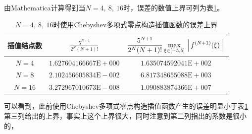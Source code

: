 \documentclass[11pt]{article}
\begin{document}
由Mathematica计算得到当$N = 4,\ 8,\ 16$时，误差的数值上界可列为表\ref{table2}。
\begin{table}[h]
    \centering
    \begin{tabular}{|c|c|c|}
        \hline
        插值结点数 & $\displaystyle \frac{5^{N + 1}}{2^N(N + 1)!}$ & $\displaystyle \frac{5^{N + 1}}{2^N(N + 1)!} \max_{\xi \in [-5, 5]}{\left \arrowvert f^{(N + 1)}(\xi) \right \arrowvert} $ \\ \hline
        $N = 4$    & $1.627604166667\text{E}+000$                  & $1.635074592041\text{E}+002$                                                                                               \\ \hline
        $N = 8$    & $2.102456605834\text{E}-002$                  & $6.817348655088\text{E}+003$                                                                                               \\ \hline
        $N = 16$   & $3.272967010673\text{E}-008$                  & $1.090883874366\text{E}+007$                                                                                               \\ \hline
    \end{tabular}
    \caption{$N = 4,\ 8,\ 16$时使用Chebyshev多项式零点构造插值函数的误差上界}
    \label{table2}
\end{table}
可以看到，此前使用Chebyshev多项式零点构造插值函数产生的误差明显小于表\ref{table2}第三列给出的上界，事实上这个上界很大，同时注意到第二列指出的系数是很小的，
\end{document}
